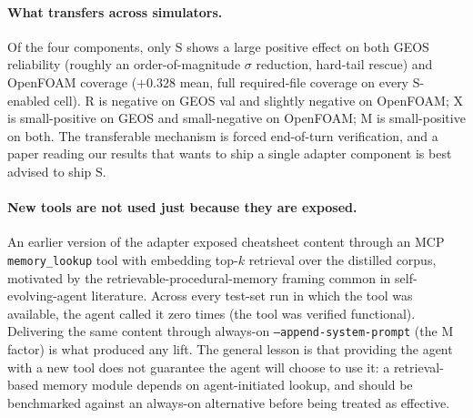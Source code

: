\documentclass{article}
\begin{document}
\paragraph{What transfers across simulators.} Of the four components, only $\mathrm{S}$ shows a large positive effect on both GEOS reliability (roughly an order-of-magnitude $\sigma$ reduction, hard-tail rescue) and OpenFOAM coverage ($+0.328$ mean, full required-file coverage on every $\mathrm{S}$-enabled cell). $\mathrm{R}$ is negative on GEOS val and slightly negative on OpenFOAM; $\mathrm{X}$ is small-positive on GEOS and small-negative on OpenFOAM; $\mathrm{M}$ is small-positive on both. The transferable mechanism is forced end-of-turn verification, and a paper reading our results that wants to ship a single adapter component is best advised to ship $\mathrm{S}$.

\paragraph{New tools are not used just because they are exposed.} An earlier version of the adapter exposed cheatsheet content through an MCP \texttt{memory\_lookup} tool with embedding top-$k$ retrieval over the distilled corpus, motivated by the retrievable-procedural-memory framing common in self-evolving-agent literature. Across every test-set run in which the tool was available, the agent called it zero times (the tool was verified functional). Delivering the same content through always-on \texttt{--append-system-prompt} (the M factor) is what produced any lift. The general lesson is that providing the agent with a new tool does not guarantee the agent will choose to use it: a retrieval-based memory module depends on agent-initiated lookup, and should be benchmarked against an always-on alternative before being treated as effective.
\end{document}
